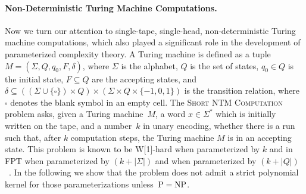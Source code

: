 \documentclass[11pt,a4,USenglish]{article}
\newcommand{\prob}[1]{\textsc{#1}}
\newcommand{\NP}{\textnormal{NP}}
\newcommand{\PTIME}{\textnormal{P}}
\newcommand{\FPT}{\textnormal{FPT}}
\newcommand{\W}[1]{\textnormal{W[#1]}}
\newcommand{\PeqNP}{$\PTIME{}=\NP{}$}
\theoremstyle{definition}
\theoremstyle{plain}
\theoremstyle{remark}
\begin{document}
%
%
%
%
%
%
%
%



%
%
%
%
%
%
%
%
%
%
%
%
%
%
%
%
%
%
%
%
%
%
%
%
%
%
%
%
%
%
%
%
%
%
%
%
%
%
%
%
%
%
%
%
%
%

%
%
%
%
%
%
%
%
%
%
%
%
%
%
%
%
%
%
%
%
%
%
%
%

%
%
%
%
%
%
%
%
%
%


%
%
%
%
%
%
%
%
%
%

\paragraph{Non-Deterministic Turing Machine Computations.}
\label{ssec:ntms}
Now we turn our attention to single-tape, single-head, non-deterministic Turing machine computations, which also played a significant role in the development of parameterized complexity theory. 
A Turing machine is defined as a tuple $M=(\Sigma, Q, q_0, F, \delta)$, where $\Sigma$ is the alphabet, $Q$ is the set of states, $q_0\in Q$ is the initial state, $F\subseteq Q$ are the accepting states, and~$\delta \subseteq ((\Sigma\cup\{\square\}) \times Q)\times (\Sigma\times Q\times \{-1, 0, 1\})$ is the transition relation, where $\square$ denotes the blank symbol in an empty cell.
%
%
The \prob{Short NTM Computation} problem asks, given a Turing machine~$M$, a word $x\in\Sigma^*$ which is initially written on the tape, and a number~$k$ in unary encoding, whether there is a run such that, after $k$ computation steps, the Turing machine $M$ is in an accepting state.
This problem is known to be \W{1}-hard when parameterized by $k$ and in \FPT{} when parameterized by $(k+|\Sigma|)$ and when parameterized by $(k+|Q|)$~\cite{DowneyF99}. In the following we show that the problem does not admit a strict polynomial kernel for those parameterizations unless~\PeqNP{}.
\end{document}
